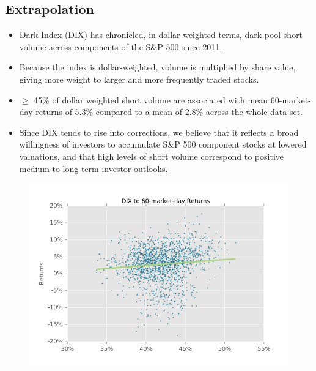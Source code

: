 \documentclass[12pt, oneside]{article}
\begin{document}
\subsection{Extrapolation}
\begin{itemize}
    \item Dark Index (DIX) has chronicled, in dollar-weighted terms, dark pool short volume across components of the S\&P 500 since 2011. 
    \item Because the index is dollar-weighted, volume is multiplied by share value, giving more weight to larger and more frequently traded stocks. 
    \item $\geq$ 45\% of dollar weighted short volume are associated with mean 60-market-day returns of 5.3\% compared to a mean of 2.8\% across the whole data set.
    \item Since DIX tends to rise into corrections, we believe that it reflects a broad willingness of investors to accumulate S\&P 500 component stocks at lowered valuations, and that high levels of short volume correspond to positive medium-to-long term investor outlooks. 
\end{itemize}
 \begin{figure}[!ht]
    \centering
    \includegraphics[width=\textwidth]{DIX to 60-market-day Returns.png}        
\end{figure}
\end{document}

